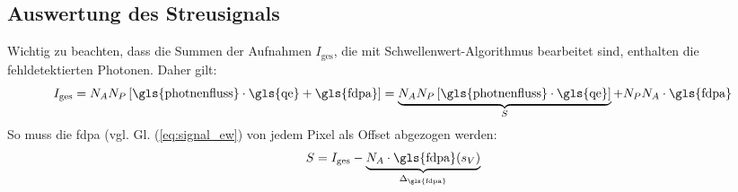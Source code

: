 \subsection{Auswertung des Streusignals}
Wichtig zu beachten, dass die Summen der Aufnahmen $I_\text{ges}$, die mit Schwellenwert-Algorithmus bearbeitet sind, enthalten die fehldetektierten Photonen. Daher gilt:
\begin{equation}
    I_\text{ges} = N_A N_P \left[\text{\gls{photnenfluss}}\cdot \text{\gls{qe}} + \text{\gls{fdpa}}\right] = \underbrace{N_A N_P \left[\text{\gls{photnenfluss}}\cdot \text{\gls{qe}}\right]}_{S} + N_P N_A\cdot\text{\gls{fdpa}}
\end{equation}
So muss die \gls{fdpa} (vgl. Gl. (\ref{eq:signal_ew}) von jedem Pixel als Offset abgezogen werden:
\begin{equation}
    S = I_\text{ges} - \underbrace{N_A\cdot\text{\gls{fdpa}}(s_V)}_{\Delta_\text{\gls{fdpa}}}
    \label{eq:signal_int_fpda}
\end{equation}

